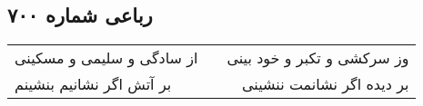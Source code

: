 \begin{center}
\section*{رباعی شماره ۷۰۰}
\label{sec:sh700}
\begin{longtable}{l p{0.5cm} r}
از سادگی و سلیمی و مسکینی
&&
وز سرکشی و تکبر و خود بینی
\\
بر آتش اگر نشانیم بنشینم
&&
بر دیده اگر نشانمت ننشینی
\\
\end{longtable}
\end{center}
